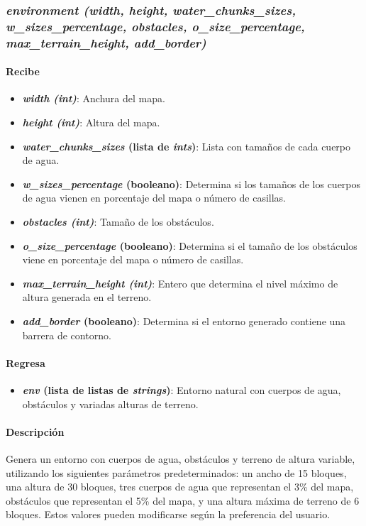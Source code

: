 \documentclass[12pt, letterpaper]{article}
\begin{document}
        \subsubsection{\textit{environment (width, height, water\_chunks\_sizes, w\_sizes\_percentage, obstacles, o\_size\_percentage, max\_terrain\_height, add\_border)}}
            \paragraph{Recibe}
                \begin{itemize}
                    \item \textbf{\textit{width (int)}}: Anchura del mapa.
                    \item \textbf{\textit{height (int)}}: Altura del mapa.
                    \item \textbf{\textit{water\_chunks\_sizes} (lista de \textit{ints})}: Lista con tamaños de cada cuerpo de agua.
                    \item \textbf{\textit{w\_sizes\_percentage} (booleano)}: Determina si los tamaños de los cuerpos de agua vienen en porcentaje del mapa o número de casillas.
                    \item \textbf{\textit{obstacles (int)}}: Tamaño de los obstáculos.
                    \item \textbf{\textit{o\_size\_percentage} (booleano)}: Determina si el tamaño de los obstáculos viene en porcentaje del mapa o número de casillas.
                    \item \textbf{\textit{max\_terrain\_height (int)}}: Entero que determina el nivel máximo de altura generada en el terreno.
                    \item \textbf{\textit{add\_border} (booleano)}: Determina si el entorno generado contiene una barrera de contorno.
                \end{itemize}
            \paragraph{Regresa}
                \begin{itemize}
                    \item \textbf{\textit{env} (lista de listas de \textit{strings})}: Entorno natural con cuerpos de agua, obstáculos y variadas alturas de terreno.
                \end{itemize}
            \paragraph{Descripción}
                Genera un entorno con cuerpos de agua, obstáculos y terreno de altura variable, utilizando los siguientes parámetros predeterminados: un ancho de 15 bloques, una altura de 30 bloques, tres cuerpos de agua que representan el 3\% del mapa, obstáculos que representan el 5\% del mapa, y una altura máxima de terreno de 6 bloques. Estos valores pueden modificarse según la preferencia del usuario.
\end{document}

